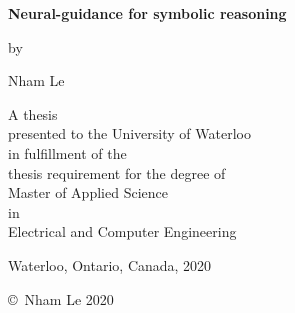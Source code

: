 \pagestyle{empty}

\begin{titlepage}
        \begin{center}
        \vspace*{1.0cm}

        \Huge
        {\bf Neural-guidance for symbolic reasoning}

        \vspace*{1.0cm}

        \normalsize
        by \\

        \vspace*{1.0cm}

        \Large
        Nham Le \\

        \vspace*{3.0cm}

        \normalsize
        A thesis \\
        presented to the University of Waterloo \\ 
        in fulfillment of the \\
        thesis requirement for the degree of \\
        Master of Applied Science \\
        in \\
        Electrical and Computer Engineering \\

        \vspace*{2.0cm}

        Waterloo, Ontario, Canada, 2020 \\

        \vspace*{1.0cm}

        \copyright\ Nham Le 2020 \\
        \end{center}
\end{titlepage}

\pagestyle{plain}
\setcounter{page}{2}

